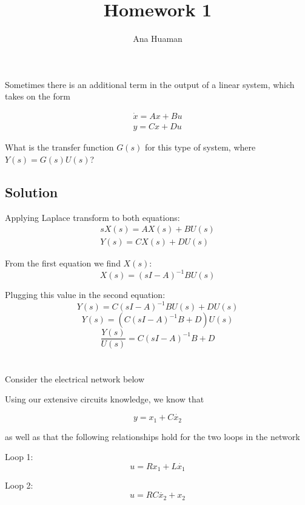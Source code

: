 \documentclass[10pt,a4paper]{article}
\author{Ana Huaman}
\title{Homework 1}
\begin{document}
\maketitle

\section{}
Sometimes there is an additional term in the output of a linear system, which takes on the form 

\[
   \begin{matrix}
   \dot{x} = Ax +Bu \\
   y = Cx + Du
   \end{matrix}
\]

What is the transfer function $G(s)$ for this type of system, where $Y(s) = G(s)U(s)$?

\subsection*{Solution}
Applying Laplace transform to both equations:
\[
  \begin{matrix}
  sX(s) = AX(s) + BU(s) \\
  Y(s) = CX(s) + DU(s)
  \end{matrix} 
\]

From the first equation we find $X(s)$:
\[ X(s) = (sI-A)^{-1}BU(s) \]

Plugging this value in the second equation:
\[ Y(s) = C(sI-A)^{-1}BU(s) + DU(s) \]
\[ Y(s) = \left ( C(sI-A)^{-1}B + D \right ) U(s) \]
\[ \dfrac{Y(s)}{U(s)} =  C(sI-A)^{-1}B + D \]
\begin{center}
\end{center}


\section{}
Consider the electrical network below

Using our extensive circuits knowledge, we know that

\[ y = x_{1} + C\dot{x_{2}} \]

as well as that the following relationships hold for the two loops in the network
\smallskip

Loop 1:
\[ u = Rx_{1} + L\dot{x_{1}} \]

Loop 2:
\[ u = RC\dot{x_{2}} + x_{2} \]
\end{document}
